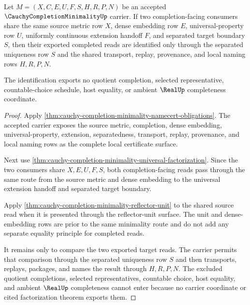 \begin{theorem}
\label{thm:cauchy-completion-minimality-dense-extension-uniqueness}
Let $M=(X,C,E,U,F,S,H,R,P,N)$ be an accepted $\CauchyCompletionMinimalityUp$ carrier. If two completion-facing consumers share the same source metric row $X$, dense embedding row $E$, universal-property row $U$, uniformly continuous extension handoff $F$, and separated target boundary $S$, then their exported completed reads are identified only through the separated uniqueness row $S$ and the shared transport, replay, provenance, and local naming rows $H,R,P,N$.

The identification exports no quotient completion, selected representative, countable-choice schedule, host equality, or ambient $\RealUp$ completeness coordinate.
\end{theorem}
\begin{proof}
Apply \autoref{thm:cauchy-completion-minimality-namecert-obligations}. The accepted carrier exposes the source metric, completion, dense embedding, universal-property, extension, separatedness, transport, replay, provenance, and local naming rows as the complete local certificate surface.

Next use \autoref{thm:cauchy-completion-minimality-universal-factorization}. Since the two consumers share $X,E,U,F,S$, both completion-facing reads pass through the same route from the source metric and dense embedding to the universal extension handoff and separated target boundary.

Apply \autoref{thm:cauchy-completion-minimality-reflector-unit} to the shared source read when it is presented through the reflector-unit surface. The unit and dense-embedding rows are prior to the same minimality route and do not add any separate equality principle for completed reads.

It remains only to compare the two exported target reads. The carrier permits that comparison through the separated uniqueness row $S$ and then transports, replays, packages, and names the result through $H,R,P,N$. The excluded quotient completions, selected representatives, countable choice, host equality, and ambient $\RealUp$ completeness cannot enter because no carrier coordinate or cited factorization theorem exports them.
\end{proof}

